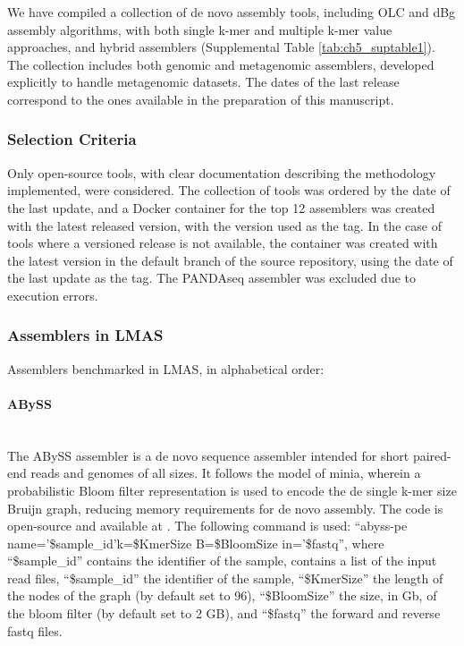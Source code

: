 We have compiled a collection of de novo assembly tools, including \ac{OLC} and \ac{dBg} assembly algorithms, with both single k-mer and multiple k-mer value approaches, and hybrid assemblers (Supplemental Table \ref{tab:ch5_suptable1}). The collection includes both genomic and metagenomic assemblers, developed explicitly to handle metagenomic datasets. The dates of the last release correspond to the ones available in the preparation of this manuscript.

\subsubsection{Selection Criteria}

Only open-source tools, with clear documentation describing the methodology implemented, were considered. The collection of tools was ordered by the date of the last update, and a Docker container \cite{noauthor_docker_nodate} for the top 12 assemblers was created with the latest released version, with the version used as the tag. In the case of tools where a versioned release is not available, the container was created with the latest version in the default branch of the source repository, using the date of the last update as the tag. The PANDAseq \cite{masella_pandaseq_2012} assembler was excluded due to execution errors. 

\subsubsection{Assemblers in LMAS}

Assemblers benchmarked in LMAS, in alphabetical order:

\paragraph{ABySS} \mbox{}\\

The ABySS assembler \cite{jackman_abyss_2017} is a de novo sequence assembler intended for short paired-end reads and genomes of all sizes. It follows the model of minia, wherein a probabilistic Bloom filter representation is used to encode the de single k-mer size Bruijn graph, reducing memory requirements for de novo assembly. The code is open-source and available at \cite{noauthor_abyss_2022}. The following command is used: “abyss-pe name='\$sample\_id'k=\$KmerSize B=\$BloomSize in='\$fastq”, where “\$sample\_id” contains the identifier of the sample,  contains a list of the input read files, “\$sample\_id” the identifier of the sample, “\$KmerSize” the length of the nodes of the graph (by default set to 96), “\$BloomSize” the size, in Gb, of the bloom filter (by default set to 2 GB), and “\$fastq” the forward and reverse fastq files. 

